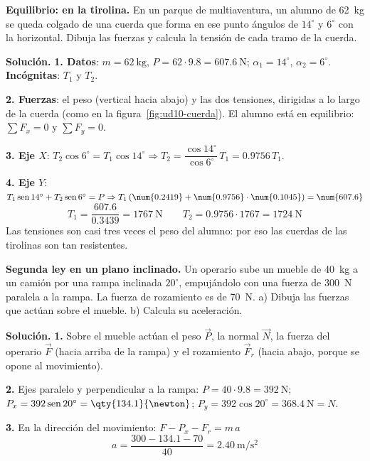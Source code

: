 \begin{example}
    \textbf{Equilibrio: en la tirolina.} En un parque de multiaventura, un alumno de \qty{62}{\kg} se queda colgado de una cuerda
    que forma en ese punto ángulos de \(14^\circ\) y \(6^\circ\) con la horizontal. Dibuja las fuerzas y calcula la tensión de cada
    tramo de la cuerda.

    \textbf{Solución.} \textbf{1. Datos}: \(m = \qty{62}{\kg}\), \(P = 62 \cdot \num{9.8} = \qty{607.6}{\newton}\);
    \(\alpha_1 = 14^\circ\), \(\alpha_2 = 6^\circ\). \textbf{Incógnitas}: \(T_1\) y \(T_2\).

    \textbf{2. Fuerzas}: el peso (vertical hacia abajo) y las dos tensiones, dirigidas a lo largo de la cuerda (como en la
    figura~\ref{fig:ud10-cuerda}). El alumno está en equilibrio: \(\sum F_x = 0\) y \(\sum F_y = 0\).

    \textbf{3. Eje \(X\)}: \(T_2\cos 6^\circ = T_1\cos 14^\circ \Rightarrow T_2 = \dfrac{\cos 14^\circ}{\cos 6^\circ}\,T_1 = \num{0.9756}\,T_1\).

    \textbf{4. Eje \(Y\)}: \(T_1\sen 14^\circ + T_2\sen 6^\circ = P \Rightarrow T_1\,(\num{0.2419} + \num{0.9756} \cdot \num{0.1045}) = \num{607.6}\)
    \[ T_1 = \frac{\num{607.6}}{\num{0.3439}} = \qty{1767}{\newton} \qquad T_2 = \num{0.9756} \cdot 1767 = \qty{1724}{\newton} \]
    Las tensiones son casi tres veces el peso del alumno: por eso las cuerdas de las tirolinas son tan resistentes.
\end{example}

\begin{example}
    \textbf{Segunda ley en un plano inclinado.} Un operario sube un mueble de \qty{40}{\kg} a un camión por una rampa inclinada
    \(20^\circ\), empujándolo con una fuerza de \qty{300}{\newton} paralela a la rampa. La fuerza de rozamiento es de \qty{70}{\newton}.
    a) Dibuja las fuerzas que actúan sobre el mueble. b) Calcula su aceleración.

    \textbf{Solución.} \textbf{1.} Sobre el mueble actúan el peso \(\vec{P}\), la normal \(\vec{N}\), la fuerza del operario
    \(\vec{F}\) (hacia arriba de la rampa) y el rozamiento \(\vec{F}_r\) (hacia abajo, porque se opone al movimiento).

    \textbf{2.} Ejes paralelo y perpendicular a la rampa: \(P = 40 \cdot \num{9.8} = \qty{392}{\newton}\);
    \(P_x = 392\sen 20^\circ = \qty{134.1}{\newton}\); \(P_y = 392\cos 20^\circ = \qty{368.4}{\newton} = N\).

    \textbf{3.} En la dirección del movimiento: \(F - P_x - F_r = m\,a\)
    \[ a = \frac{300 - \num{134.1} - 70}{40} = \qty{2.40}{\m\per\s\squared} \]
\end{example}

